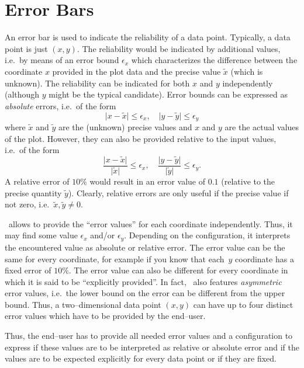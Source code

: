
\section{Error Bars}
\label{sec:errorbars}
{%
\def\pgfplotserror#1{\ensuremath{\epsilon_{#1}}}%

An error bar is used to indicate the reliability of a data point. Typically, a data point is just $(x,y)$. The reliability would be indicated by additional values, i.e.\ by means of an error bound $\pgfplotserror{x}$ which characterizes the difference between the coordinate $x$ provided in the plot data and the precise value $\tilde x$ (which is unknown). The reliability can be indicated for both $x$ and $y$ independently (although $y$ might be the typical candidate). Error bounds can be expressed as \emph{absolute} errors, i.e.\ of the form
\[ \lvert{x- \tilde x}\rvert \le \pgfplotserror{x}, \quad \lvert{y-\tilde y}\rvert \le \pgfplotserror{y} \]
where $\tilde x$ and $\tilde y$ are the (unknown) precise values and $x$ and $y$ are the actual values of the plot. However, they can also be provided relative to the input values, i.e.\ of the form
\[ \frac{\lvert{x-\tilde x}\rvert} {\lvert\tilde x\rvert} \le \pgfplotserror{x}, \quad \frac{\lvert{y-\tilde y}\rvert} {\lvert\tilde y\rvert} \le \pgfplotserror{y}.\]
A relative error of $10\%$ would result in an error value of $0.1$ (relative to the precise quantity $\tilde y$). Clearly, relative errors are only useful if the precise value if not zero, i.e.\ $\tilde x, \tilde y \neq 0$. 

\PGFPlots\ allows to provide the ``error values'' for each coordinate independently. Thus, it may find some value $\pgfplotserror{x}$ and/or $\pgfplotserror{y}$. Depending on the configuration, it interprets the encountered value as absolute or relative error. The error value can be the same for every coordinate, for example if you know that each~$y$ coordinate has a fixed error of $10\%$. The error value can also be different for every coordinate in which it is said to be ``explicitly provided''. In fact, \PGFPlots\ also features \emph{asymmetric} error values, i.e.\ the lower bound on the error can be different from the upper bound. Thus, a two--dimensional data point $(x,y)$ can have up to four distinct error values which have to be provided by the end--user.

Thus, the end--user has to provide all needed error values and a configuration to express if these values are to be interpreted as relative or absolute error and if the values are to be expected explicitly for every data point or if they are fixed. 

}
